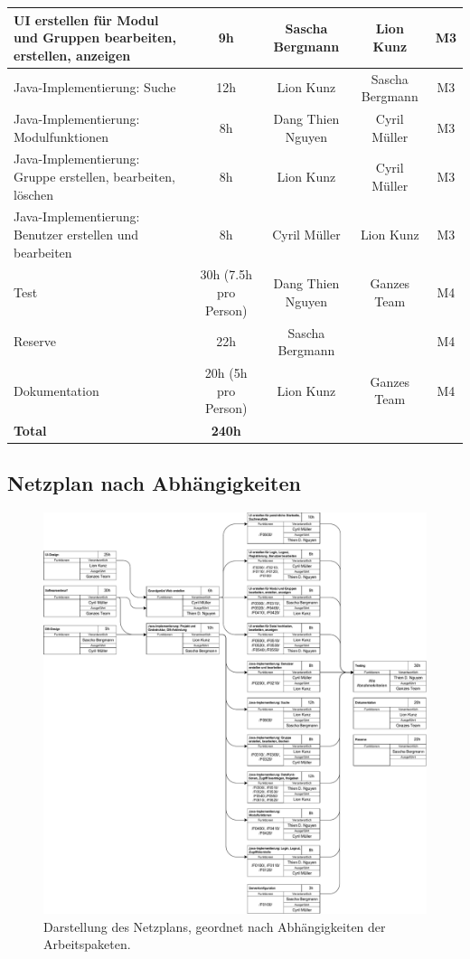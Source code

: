 \begin{landscape}
\begin{tabularx}{\linewidth}{|X|c|c|c|c|}
UI erstellen für Modul und Gruppen bearbeiten, erstellen, anzeigen		&	9h	&	Sascha Bergmann	&	Lion Kunz&	M3\\ \hline
Java-Implementierung: Suche 											&	12h	&	Lion Kunz		&	Sascha Bergmann&	M3\\ \hline
Java-Implementierung: Modulfunktionen 									&	8h	&	Dang Thien Nguyen&	Cyril Müller&	M3\\ \hline
Java-Implementierung: Gruppe erstellen, bearbeiten, löschen 			&	8h	&	Lion Kunz		&	Cyril Müller&	M3\\ \hline
Java-Implementierung: Benutzer erstellen und bearbeiten 				&	8h	&	Cyril Müller	&	Lion Kunz&	M3\\ \hline
Test 																	&	30h (7.5h pro Person)	&	Dang Thien Nguyen&	Ganzes Team&	M4\\ \hline
Reserve 																&	22h	&	Sascha Bergmann	&	&	M4\\ \hline
Dokumentation 															&	20h (5h pro Person)&	Lion Kunz		&	Ganzes Team&	M4\\ \hline
\textbf{Total}																	&	\textbf{240h}	&		&	&	\\ \hline
\end{tabularx}
\end{landscape}


\subsection{Netzplan nach Abhängigkeiten}
\label{sec:netzplan_abhaengigkeiten}
\begin{figure}[H]
\includegraphics[width=1.1\linewidth]{graphics/netzplan_s1.pdf}
\caption{Darstellung des Netzplans, geordnet nach Abhängigkeiten der Arbeitspaketen.}
\end{figure}